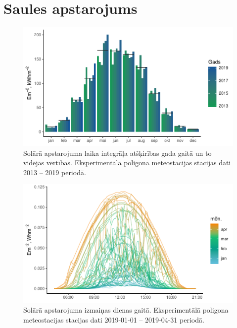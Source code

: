 \section{Saules apstarojums}


\begin{figure}[h]
    \centering
    \includegraphics[width=\linewidth]{figures/meteo/meanYears.pdf}
    \caption{Solārā apstarojuma laika integrāļa atšķirības gada gaitā un to vidējās vērtības. Eksperimentālā poligona meteostacijas stacijas dati 2013 -- 2019 periodā.}
    \label{fig:metYears_mean}
\end{figure}
\begin{figure}[h]
    \centering
    \includegraphics[width=\linewidth]{figures/meteo/sun19.pdf}
    \caption{Solārā apstarojuma izmaiņas dienas gaitā. Eksperimentālā poligona meteostacijas stacijas dati 2019-01-01 -- 2019-04-31 periodā.}
    \label{fig:met_Irrad}
\end{figure}
